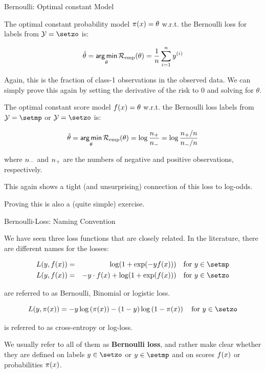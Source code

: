 \begin{vbframe}{Bernoulli: Optimal constant Model}

The optimal constant probability model $\pi(x) = \theta$ w.r.t. the Bernoulli loss for labels from $\Yspace = \setzo$ is:

\begin{eqnarray*}
  \hat{\theta} = \mathop{\sf arg\,min}_{\theta} \mathcal{R}_{\text{emp}}(\theta) = \frac{1}{n} \sum_{i=1}^n y^{(i)}
\end{eqnarray*}

Again, this is the fraction of class-1 observations in the observed data.
We can simply prove this again by setting the derivative of the risk to 0 and solving for $\theta$.

\framebreak

The optimal constant score model $f(x) = \theta$ w.r.t. the Bernoulli loss labels from $\Yspace = \setmp$ or $\Yspace = \setzo$ is:

\begin{eqnarray*}
  \hat{\theta} = \mathop{\sf arg\,min}_{\theta} \mathcal{R}_{\text{emp}}(\theta) = \log \frac{n_{+}}{n_{-}} = \log \frac{n_{+} / n}{n_{-} /n} 
\end{eqnarray*}

where $n_{-}$ and $n_{+}$ are the numbers of negative and positive observations, respectively.

\lz

This again shows a tight (and unsurprising) connection of this loss to log-odds.

\lz

Proving this is also a (quite simple) exercise.

\end{vbframe}

\begin{vbframe}{Bernoulli-Loss: Naming Convention}

We have seen three loss functions that are closely related. In the literature, there are different names for the losses: 

\begin{eqnarray*}
  L(y, \fx) &=& \log(1+\exp(-y\fx)) \quad \text{for } y \in \setmp \\
  L(y, \fx) &=& - y \cdot \fx + \log(1 + \exp(\fx)) \quad \text{for } y \in \setzo 
\end{eqnarray*}

are referred to as Bernoulli, Binomial or logistic loss. 

  $$
    L(y, \pix) = - y \log \left(\pix\right) - (1 - y) \log \left(1 - \pix\right) \quad \text{for } y \in \setzo
  $$

is referred to as cross-entropy or log-loss. 

\lz 

We usually refer to all of them as \textbf{Bernoulli loss}, and rather make clear whether they are defined on labels $y \in \setzo$ or $y \in \setmp$ and on scores $f(x)$ or probabilities $\pi(x)$. 

\end{vbframe}



